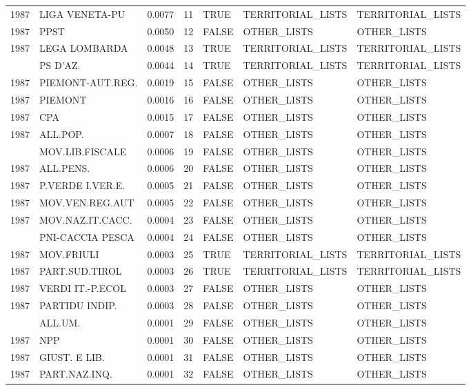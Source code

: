\begin{longtable}[t]{rlrrlll}
1987 & LIGA VENETA-PU & 0.0077 & 11 & TRUE & TERRITORIAL\_LISTS & TERRITORIAL\_LISTS\\
1987 & PPST & 0.0050 & 12 & FALSE & OTHER\_LISTS & OTHER\_LISTS\\
1987 & LEGA LOMBARDA & 0.0048 & 13 & TRUE & TERRITORIAL\_LISTS & TERRITORIAL\_LISTS\\
\addlinespace
1987 & PS D'AZ. & 0.0044 & 14 & TRUE & TERRITORIAL\_LISTS & TERRITORIAL\_LISTS\\
1987 & PIEMONT-AUT.REG. & 0.0019 & 15 & FALSE & OTHER\_LISTS & OTHER\_LISTS\\
1987 & PIEMONT & 0.0016 & 16 & FALSE & OTHER\_LISTS & OTHER\_LISTS\\
1987 & CPA & 0.0015 & 17 & FALSE & OTHER\_LISTS & OTHER\_LISTS\\
1987 & ALL.POP. & 0.0007 & 18 & FALSE & OTHER\_LISTS & OTHER\_LISTS\\
\addlinespace
1987 & MOV.LIB.FISCALE & 0.0006 & 19 & FALSE & OTHER\_LISTS & OTHER\_LISTS\\
1987 & ALL.PENS. & 0.0006 & 20 & FALSE & OTHER\_LISTS & OTHER\_LISTS\\
1987 & P.VERDE I.VER.E. & 0.0005 & 21 & FALSE & OTHER\_LISTS & OTHER\_LISTS\\
1987 & MOV.VEN.REG.AUT & 0.0005 & 22 & FALSE & OTHER\_LISTS & OTHER\_LISTS\\
1987 & MOV.NAZ.IT.CACC. & 0.0004 & 23 & FALSE & OTHER\_LISTS & OTHER\_LISTS\\
\addlinespace
1987 & PNI-CACCIA PESCA & 0.0004 & 24 & FALSE & OTHER\_LISTS & OTHER\_LISTS\\
1987 & MOV.FRIULI & 0.0003 & 25 & TRUE & TERRITORIAL\_LISTS & TERRITORIAL\_LISTS\\
1987 & PART.SUD.TIROL & 0.0003 & 26 & TRUE & TERRITORIAL\_LISTS & TERRITORIAL\_LISTS\\
1987 & VERDI IT.-P.ECOL & 0.0003 & 27 & FALSE & OTHER\_LISTS & OTHER\_LISTS\\
1987 & PARTIDU INDIP. & 0.0003 & 28 & FALSE & OTHER\_LISTS & OTHER\_LISTS\\
\addlinespace
1987 & ALL.UM. & 0.0001 & 29 & FALSE & OTHER\_LISTS & OTHER\_LISTS\\
1987 & NPP & 0.0001 & 30 & FALSE & OTHER\_LISTS & OTHER\_LISTS\\
1987 & GIUST. E LIB. & 0.0001 & 31 & FALSE & OTHER\_LISTS & OTHER\_LISTS\\
1987 & PART.NAZ.INQ. & 0.0001 & 32 & FALSE & OTHER\_LISTS & OTHER\_LISTS\\

\end{longtable}
